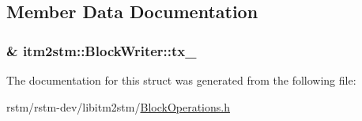 \subsection{Member Data Documentation}
\hypertarget{structitm2stm_1_1BlockWriter_a0a263b48c04d16925c3ba13b21e47735}{
\subsubsection[{tx\-\_\-}]{\& itm2stm\-::\-Block\-Writer\-::tx\-\_\-}}\label{structitm2stm_1_1BlockWriter_a0a263b48c04d16925c3ba13b21e47735}


The documentation for this struct was generated from the following file\-:\begin{DoxyCompactItemize}
\item 
rstm/rstm-\/dev/libitm2stm/\hyperlink{BlockOperations_8h}{Block\-Operations.\-h}\end{DoxyCompactItemize}
